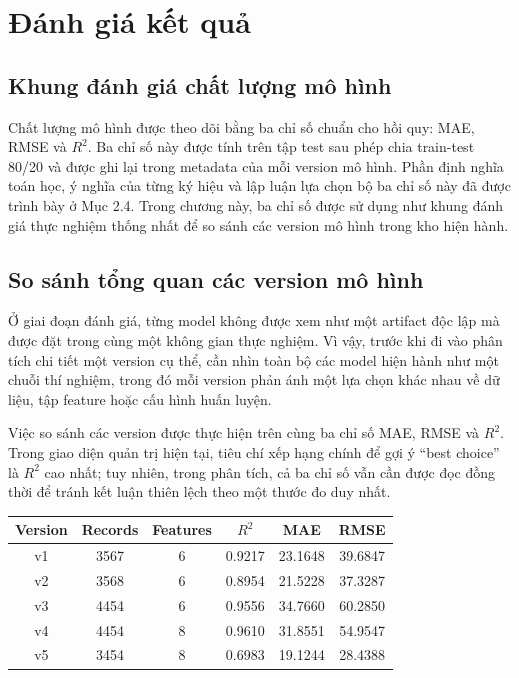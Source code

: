\section{Đánh giá kết quả}

\subsection{Khung đánh giá chất lượng mô hình}

Chất lượng mô hình được theo dõi bằng ba chỉ số chuẩn cho hồi quy: MAE, RMSE và $R^2$. Ba chỉ số này được tính trên tập test sau phép chia train-test 80/20 và được ghi lại trong metadata của mỗi version mô hình. Phần định nghĩa toán học, ý nghĩa của từng ký hiệu và lập luận lựa chọn bộ ba chỉ số này đã được trình bày ở Mục 2.4. Trong chương này, ba chỉ số được sử dụng như khung đánh giá thực nghiệm thống nhất để so sánh các version mô hình trong kho hiện hành.
\subsection{So sánh tổng quan các version mô hình}

Ở giai đoạn đánh giá, từng model không được xem như một artifact độc lập mà được đặt trong cùng một không gian thực nghiệm. Vì vậy, trước khi đi vào phân tích chi tiết một version cụ thể, cần nhìn toàn bộ các model hiện hành như một chuỗi thí nghiệm, trong đó mỗi version phản ánh một lựa chọn khác nhau về dữ liệu, tập feature hoặc cấu hình huấn luyện.


Việc so sánh các version được thực hiện trên cùng ba chỉ số MAE, RMSE và $R^2$. Trong giao diện quản trị hiện tại, tiêu chí xếp hạng chính để gợi ý ``best choice'' là $R^2$ cao nhất; tuy nhiên, trong phân tích, cả ba chỉ số vẫn cần được đọc đồng thời để tránh kết luận thiên lệch theo một thước đo duy nhất.


\begin{center}
\begin{tabular}{|c|c|c|c|c|c|}
\hline
\textbf{Version} & \textbf{Records} & \textbf{Features} & \textbf{$R^2$} & \textbf{MAE} & \textbf{RMSE} \\
\hline
v1 & 3567 & 6 & 0.9217 & 23.1648 & 39.6847 \\
\hline
v2 & 3568 & 6 & 0.8954 & 21.5228 & 37.3287 \\
\hline
v3 & 4454 & 6 & 0.9556 & 34.7660 & 60.2850 \\
\hline
v4 & 4454 & 8 & 0.9610 & 31.8551 & 54.9547 \\
\hline
v5 & 3454 & 8 & 0.6983 & 19.1244 & 28.4388 \\
\hline
\end{tabular}
\end{center}

